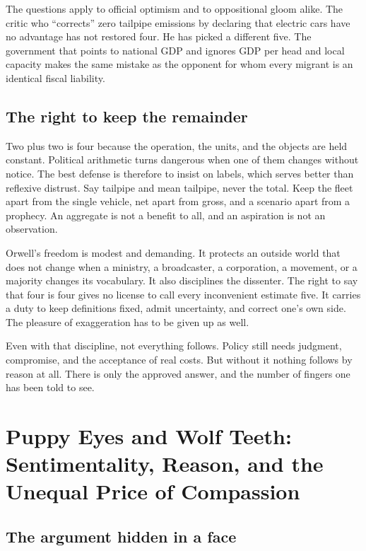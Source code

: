 \documentclass[12pt,a4paper]{book}
\begin{document}
The questions apply to official optimism and to oppositional gloom alike. The critic who ``corrects'' zero tailpipe emissions by declaring that electric cars have no advantage has not restored four. He has picked a different five. The government that points to national GDP and ignores GDP per head and local capacity makes the same mistake as the opponent for whom every migrant is an identical fiscal liability.

\section{The right to keep the remainder}

Two plus two is four because the operation, the units, and the objects are held constant. Political arithmetic turns dangerous when one of them changes without notice. The best defense is therefore to insist on labels, which serves better than reflexive distrust. Say tailpipe and mean tailpipe, never the total. Keep the fleet apart from the single vehicle, net apart from gross, and a scenario apart from a prophecy. An aggregate is not a benefit to all, and an aspiration is not an observation.

Orwell's freedom is modest and demanding. It protects an outside world that does not change when a ministry, a broadcaster, a corporation, a movement, or a majority changes its vocabulary. It also disciplines the dissenter. The right to say that four is four gives no license to call every inconvenient estimate five. It carries a duty to keep definitions fixed, admit uncertainty, and correct one's own side. The pleasure of exaggeration has to be given up as well.

Even with that discipline, not everything follows. Policy still needs judgment, compromise, and the acceptance of real costs. But without it nothing follows by reason at all. There is only the approved answer, and the number of fingers one has been told to see.


\chapter[Puppy Eyes and Wolf Teeth]{Puppy Eyes and Wolf Teeth: Sentimentality, Reason, and the Unequal Price of Compassion}
\label{chap:sentimentality-rationality}

\section{The argument hidden in a face}
\end{document}
